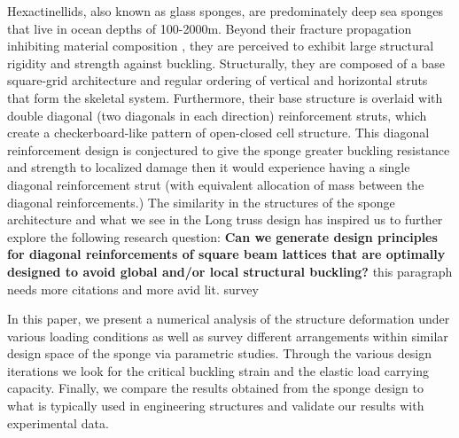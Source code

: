 \documentclass[9pt,twocolumn,twoside]{fernandes_paper}
\newcommand{\mf}[1]{\colorbox{blue!10}{\color{color3}#1}}
\begin{document}
Hexactinellids, also known as glass sponges, are predominately deep sea sponges that live in ocean depths of 100-2000m. Beyond their fracture propagation inhibiting material composition \citep{weaver2007}, they are perceived to exhibit large structural rigidity and strength against buckling. 
Structurally, they are composed of a base square-grid architecture and regular ordering of vertical and horizontal struts that form the skeletal system. Furthermore, their base structure is overlaid with double diagonal (two diagonals in each direction) reinforcement struts, which create a checkerboard-like pattern of open-closed cell structure. This diagonal reinforcement design is conjectured to give the sponge greater buckling resistance and strength to localized damage then it would experience having a single diagonal reinforcement strut (with equivalent allocation of mass between the diagonal reinforcements.) 
The similarity in the structures of the sponge architecture and what we see in the Long truss design has inspired us to further explore the following research question: \textbf{Can we generate design principles for diagonal reinforcements of square beam lattices that are optimally designed to avoid global and/or local structural buckling?} \mf{this paragraph needs more citations and more avid lit. survey}

In this paper, we present a numerical analysis of the structure deformation under various loading conditions as well as survey different arrangements within similar design space of the sponge via parametric studies. Through the various design iterations we look for the critical buckling strain and the elastic load carrying capacity. Finally, we compare the results obtained from the sponge design to what is typically used in engineering structures and validate our results with experimental data.

\end{document}
